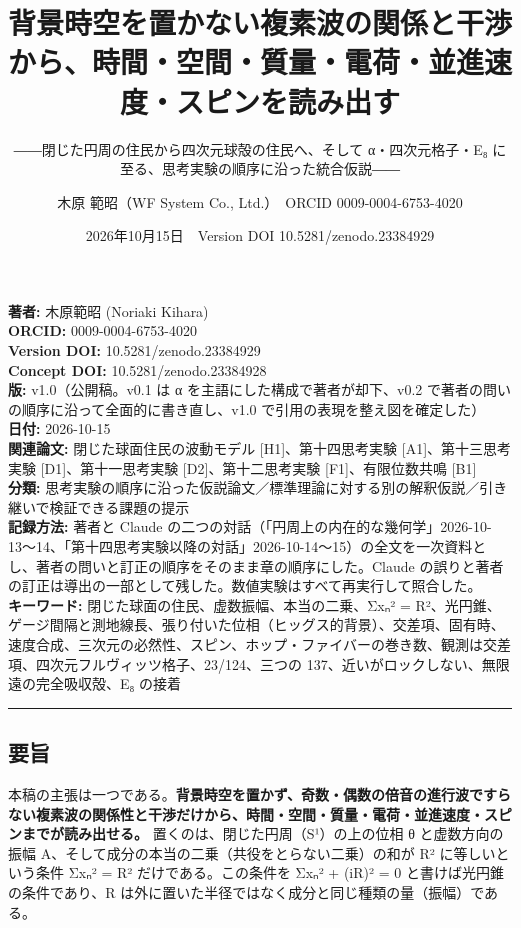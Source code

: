 \documentclass[
  a4paper,
]{ltjsarticle}
\title{背景時空を置かない複素波の関係と干渉から、時間・空間・質量・電荷・並進速度・スピンを読み出す}
\subtitle{――閉じた円周の住民から四次元球殻の住民へ、そして
α・四次元格子・E₈ に至る、思考実験の順序に沿った統合仮説――}
\author{木原 範昭（WF System Co., Ltd.）　ORCID 0009-0004-6753-4020}
\date{2026年10月15日　Version DOI 10.5281/zenodo.23384929}
\begin{document}
\maketitle

\textbf{著者:} 木原範昭 (Noriaki Kihara)\\
\textbf{ORCID:} 0009-0004-6753-4020\\
\textbf{Version DOI:} 10.5281/zenodo.23384929\\
\textbf{Concept DOI:} 10.5281/zenodo.23384928\\
\textbf{版:} v1.0（公開稿。v0.1 は α を主語にした構成で著者が却下、v0.2
で著者の問いの順序に沿って全面的に書き直し、v1.0
で引用の表現を整え図を確定した）\\
\textbf{日付:} 2026-10-15\\
\textbf{関連論文:} 閉じた球面住民の波動モデル {[}H1{]}、第十四思考実験
{[}A1{]}、第十三思考実験 {[}D1{]}、第十一思考実験
{[}D2{]}、第十二思考実験 {[}F1{]}、有限位数共鳴 {[}B1{]}\\
\textbf{分類:}
思考実験の順序に沿った仮説論文／標準理論に対する別の解釈仮説／引き継いで検証できる課題の提示\\
\textbf{記録方法:} 著者と Claude
の二つの対話（「円周上の内在的な幾何学」2026-10-13〜14、「第十四思考実験以降の対話」2026-10-14〜15）の全文を一次資料とし、著者の問いと訂正の順序をそのまま章の順序にした。Claude
の誤りと著者の訂正は導出の一部として残した。数値実験はすべて再実行して照合した。\\
\textbf{キーワード:} 閉じた球面の住民、虚数振幅、本当の二乗、Σxₙ² =
R²、光円錐、ゲージ間隔と測地線長、張り付いた位相（ヒッグス的背景）、交差項、固有時、速度合成、三次元の必然性、スピン、ホップ・ファイバーの巻き数、観測は交差項、四次元フルヴィッツ格子、23/124、三つの
137、近いがロックしない、無限遠の完全吸収殻、E₈ の接着

\begin{center}\rule{0.5\linewidth}{0.5pt}\end{center}

\subsection{要旨}\label{ux8981ux65e8}

本稿の主張は一つである。\textbf{背景時空を置かず、奇数・偶数の倍音の進行波ですらない複素波の関係性と干渉だけから、時間・空間・質量・電荷・並進速度・スピンまでが読み出せる。}
置くのは、閉じた円周（S¹）の上の位相 θ と虚数方向の振幅
A、そして成分の本当の二乗（共役をとらない二乗）の和が R²
に等しいという条件 Σxₙ² = R² だけである。この条件を Σxₙ² + (iR)² = 0
と書けば光円錐の条件であり、R
は外に置いた半径ではなく成分と同じ種類の量（振幅）である。
\end{document}
